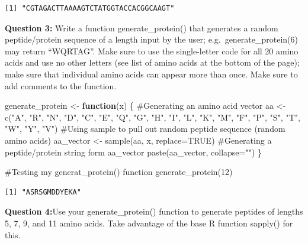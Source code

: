 \documentclass[
  letterpaper,
  DIV=11,
  numbers=noendperiod]{scrartcl}
\newenvironment{Shaded}{\begin{snugshade}}{\end{snugshade}}
\newcommand{\AttributeTok}[1]{\textcolor[rgb]{0.40,0.45,0.13}{#1}}
\newcommand{\CommentTok}[1]{\textcolor[rgb]{0.37,0.37,0.37}{#1}}
\newcommand{\ConstantTok}[1]{\textcolor[rgb]{0.56,0.35,0.01}{#1}}
\newcommand{\ControlFlowTok}[1]{\textcolor[rgb]{0.00,0.23,0.31}{\textbf{#1}}}
\newcommand{\DecValTok}[1]{\textcolor[rgb]{0.68,0.00,0.00}{#1}}
\newcommand{\FunctionTok}[1]{\textcolor[rgb]{0.28,0.35,0.67}{#1}}
\newcommand{\NormalTok}[1]{\textcolor[rgb]{0.00,0.23,0.31}{#1}}
\newcommand{\OtherTok}[1]{\textcolor[rgb]{0.00,0.23,0.31}{#1}}
\newcommand{\StringTok}[1]{\textcolor[rgb]{0.13,0.47,0.30}{#1}}
\begin{document}
\begin{verbatim}
[1] "CGTAGACTTAAAAGTCTATGGTACCACGGCAAGT"
\end{verbatim}

\textbf{Question 3:} Write a function generate\_protein() that generates
a random peptide/protein sequence of a length input by the user;
e.g.~generate\_protein(6) may return ``WQRTAG''. Make sure to use the
single-letter code for all 20 amino acids and use no other letters (see
list of amino acids at the bottom of the page); make sure that
individual amino acids can appear more than once. Make sure to add
comments to the function.

\begin{Shaded}
\begin{Highlighting}[]
\NormalTok{  generate\_protein }\OtherTok{\textless{}{-}} \ControlFlowTok{function}\NormalTok{(x) \{}
    \CommentTok{\#Generating an amino acid vector}
\NormalTok{    aa }\OtherTok{\textless{}{-}} \FunctionTok{c}\NormalTok{(}\StringTok{"A"}\NormalTok{, }\StringTok{"R"}\NormalTok{, }\StringTok{"N"}\NormalTok{, }\StringTok{"D"}\NormalTok{, }\StringTok{"C"}\NormalTok{, }\StringTok{"E"}\NormalTok{, }\StringTok{"Q"}\NormalTok{, }\StringTok{"G"}\NormalTok{, }\StringTok{"H"}\NormalTok{, }\StringTok{"I"}\NormalTok{, }\StringTok{"L"}\NormalTok{, }\StringTok{"K"}\NormalTok{, }\StringTok{"M"}\NormalTok{, }\StringTok{"F"}\NormalTok{, }\StringTok{"P"}\NormalTok{, }\StringTok{"S"}\NormalTok{, }\StringTok{"T"}\NormalTok{, }\StringTok{"W"}\NormalTok{, }\StringTok{"Y"}\NormalTok{, }\StringTok{"V"}\NormalTok{)}
    \CommentTok{\#Using sample to pull out random peptide sequence (random amino acids)}
\NormalTok{   aa\_vector }\OtherTok{\textless{}{-}} \FunctionTok{sample}\NormalTok{(aa, x, }\AttributeTok{replace=}\ConstantTok{TRUE}\NormalTok{)}
   \CommentTok{\#Generating a peptide/protein string form aa\_vector}
   \FunctionTok{paste}\NormalTok{(aa\_vector, }\AttributeTok{collapse=}\StringTok{""}\NormalTok{)}
\NormalTok{  \}}

\CommentTok{\#Testing my generat\_protein() function}
\FunctionTok{generate\_protein}\NormalTok{(}\DecValTok{12}\NormalTok{)}
\end{Highlighting}
\end{Shaded}

\begin{verbatim}
[1] "ASRSGMDDYEKA"
\end{verbatim}

\textbf{Question 4:}Use your generate\_protein() function to generate
peptides of lengths 5, 7, 9, and 11 amino acids. Take advantage of the
base R function sapply() for this.
\end{document}
